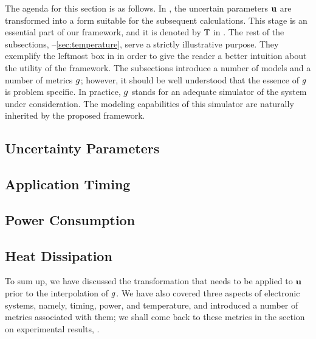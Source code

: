 The agenda for this section is as follows. In , the uncertain
parameters $\mathbf{u}$ are transformed into a form suitable for the subsequent
calculations. This stage is an essential part of our framework, and it is
denoted by $\mathbb{T}$ in . The rest of the subsections,
--\ref{sec:temperature}, serve a strictly illustrative purpose.
They exemplify the leftmost box in  in order to give the reader a
better intuition about the utility of the framework. The subsections introduce a
number of models and a number of metrics $g$; however, it should be well
understood that the essence of $g$ is problem specific. In practice, $g$
stands for an adequate simulator of the system under consideration. The modeling
capabilities of this simulator are naturally inherited by the proposed
framework.

\subsection{Uncertainty Parameters} 


\subsection{Application Timing} 


\subsection{Power Consumption} 


\subsection{Heat Dissipation} 


To sum up, we have discussed the transformation that needs to be applied to
$\mathbf{u}$ prior to the interpolation of $g$. We have also covered three aspects of
electronic systems, namely, timing, power, and temperature, and introduced a
number of metrics associated with them; we shall come back to these metrics in
the section on experimental results, .
